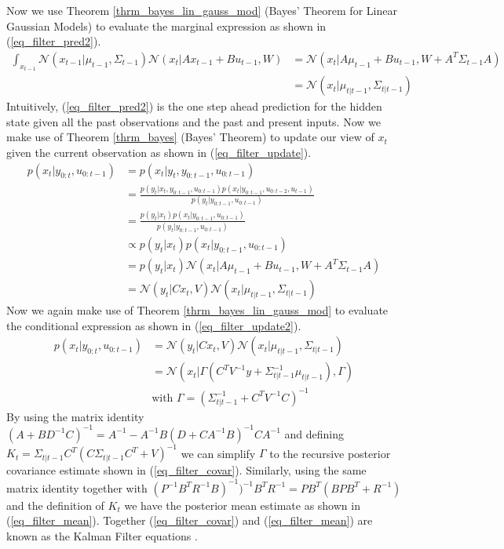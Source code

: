 Now we use Theorem \ref{thrm_bayes_lin_gauss_mod} (Bayes' Theorem for Linear Gaussian Models) to evaluate the marginal expression as shown in (\ref{eq_filter_pred2}).
\begin{equation}
\begin{aligned}
\int_{x_{t-1}} \mathcal{N}(x_{t-1}|\mu_{t-1}, \Sigma_{t-1}) \mathcal{N}(x_{t}|Ax_{t-1}+Bu_{t-1}, W) &= \mathcal{N}(x_t|A\mu_{t-1}+Bu_{t-1
}, W+ A^T\Sigma_{t-1}A) \\
&= \mathcal{N}(x_t|\mu_{t|t-1},\Sigma_{t|t-1})
\end{aligned}
\label{eq_filter_pred2}
\end{equation}
Intuitively, (\ref{eq_filter_pred2}) is the one step ahead prediction for the hidden state given all the past observations and the past and present inputs. Now we make use of Theorem \ref{thrm_bayes} (Bayes' Theorem) to update our view of $x_t$ given the current observation as shown in (\ref{eq_filter_update}).
\begin{equation}
\begin{aligned}
p(x_t|y_{0:t},u_{0:t-1}) &= p(x_t|y_{t},y_{0:t-1},u_{0:t-1}) \\
&= \frac{p(y_t|x_t,y_{0:t-1},u_{0:t-1})p(x_t|y_{0:t-1},u_{0:t-2}, u_{t-1})}{p(y_t|y_{0:t-1},u_{0:t-1})} \\
&= \frac{p(y_t|x_t)p(x_t|y_{0:t-1},u_{0:t-1})}{p(y_t|y_{0:t-1},u_{0:t-1})} \\
&\propto p(y_t|x_t)p(x_t|y_{0:t-1},u_{0:t-1})\\
&= p(y_t|x_t)\mathcal{N}(x_t|A\mu_{t-1}+Bu_{t-1
}, W+ A^T\Sigma_{t-1}A) \\
&= \mathcal{N}(y_{t}|Cx_{t}, V)\mathcal{N}(x_t|\mu_{t|t-1},\Sigma_{t|t-1})
\end{aligned}
\label{eq_filter_update}
\end{equation}
Now we again make use of Theorem \ref{thrm_bayes_lin_gauss_mod} to evaluate the conditional expression as shown in (\ref{eq_filter_update2}).
\begin{equation}
\begin{aligned}
p(x_t|y_{0:t},u_{0:t-1}) &=\mathcal{N}(y_{t}|Cx_{t}, V)\mathcal{N}(x_t|\mu_{t|t-1},\Sigma_{t|t-1})\\ 
&= \mathcal{N}(x_t|\Gamma(C^TV^{-1}y + \Sigma_{t|t-1}^{-1}\mu_{t|t-1}), \Gamma) \\
&\text{with } \Gamma = (\Sigma_{t|t-1}^{-1}+C^TV^{-1}C)^{-1} 
\end{aligned}
\label{eq_filter_update2}
\end{equation} 
By using the matrix identity $(A+BD^{-1}C)^{-1}=A^{-1}-A^{-1}B(D+CA^{-1}B)^{-1}CA^{-1}$ and defining $K_t = \Sigma_{t|t-1}C^T(C\Sigma_{t|t-1}C^T+V)^{-1}$ we can simplify $\Gamma$ to the recursive posterior covariance estimate shown in (\ref{eq_filter_covar}). Similarly, using the same matrix identity together with $(P^{-1} B^TR^{-1}B)^{-1})^{-1}B^TR^{-1} = PB^T(BPB^T+R^{-1})$ and the definition of $K_t$ we have the posterior mean estimate as shown in (\ref{eq_filter_mean}). Together (\ref{eq_filter_covar}) and (\ref{eq_filter_mean}) are known as the Kalman Filter equations \cite{murphy2}.
